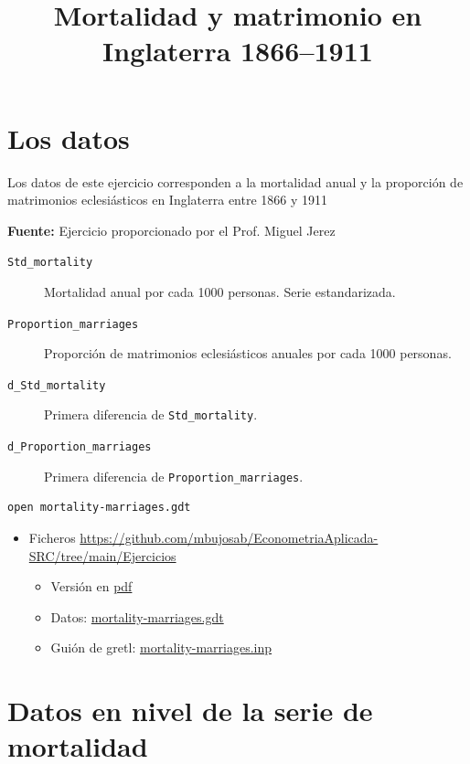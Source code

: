 \documentclass[10pt]{article}
\date{}
\title{Mortalidad y matrimonio en Inglaterra 1866--1911}
\begin{document}
\maketitle
\section*{Los datos}
\label{sec:org01acdab}

Los datos de este ejercicio corresponden a la mortalidad anual y la
proporción de matrimonios eclesiásticos en Inglaterra entre 1866 y
1911 

\textbf{Fuente:} Ejercicio proporcionado por el Prof. Miguel Jerez

\begin{description}
\item[{\texttt{Std\_mortality}}] Mortalidad anual por cada 1000 personas. Serie estandarizada.
\item[{\texttt{Proportion\_marriages}}] Proporción de matrimonios eclesiásticos
anuales por cada 1000 personas.
\item[{\texttt{d\_Std\_mortality}}] Primera diferencia de \texttt{Std\_mortality}.
\item[{\texttt{d\_Proportion\_marriages}}] Primera diferencia de
\texttt{Proportion\_marriages}.
\end{description}

\begin{verbatim}
open mortality-marriages.gdt
\end{verbatim}

\begin{itemize}
\item Ficheros \url{https://github.com/mbujosab/EconometriaAplicada-SRC/tree/main/Ejercicios}
\begin{itemize}
\item Versión en \href{https://github.com/mbujosab/EconometriaAplicada-SRC/blob/main/Ejercicios/mortality-marriages.pdf}{pdf}
\item Datos: \href{mortality-marriages.gdt}{mortality-marriages.gdt}
\item Guión de gretl: \href{mortality-marriages.inp}{mortality-marriages.inp}
\end{itemize}
\end{itemize}
\section*{Datos en nivel de la serie de mortalidad}
\label{sec:org61b8055}
\end{document}

